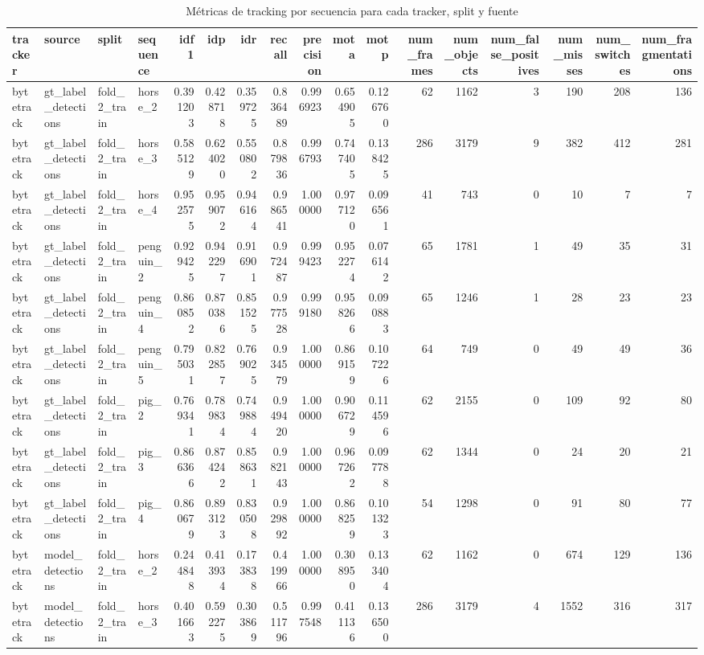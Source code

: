 \begin{table}
\caption{Métricas de tracking por secuencia para cada tracker, split y fuente}
\label{tab:per_sequence_tracking_metrics}
\begin{tabular}{llllrrrrrrrrrrrrr}
\toprule
tracker & source & split & sequence & idf1 & idp & idr & recall & precision & mota & motp & num_frames & num_objects & num_false_positives & num_misses & num_switches & num_fragmentations \\
\midrule
bytetrack & gt_label_detections & fold_2_train & horse_2 & 0.391203 & 0.428718 & 0.359725 & 0.836489 & 0.996923 & 0.654905 & 0.126760 & 62 & 1162 & 3 & 190 & 208 & 136 \\
bytetrack & gt_label_detections & fold_2_train & horse_3 & 0.585129 & 0.624020 & 0.550802 & 0.879836 & 0.996793 & 0.747405 & 0.138425 & 286 & 3179 & 9 & 382 & 412 & 281 \\
bytetrack & gt_label_detections & fold_2_train & horse_4 & 0.952575 & 0.959072 & 0.946164 & 0.986541 & 1.000000 & 0.977120 & 0.096561 & 41 & 743 & 0 & 10 & 7 & 7 \\
bytetrack & gt_label_detections & fold_2_train & penguin_2 & 0.929425 & 0.942297 & 0.916901 & 0.972487 & 0.999423 & 0.952274 & 0.076142 & 65 & 1781 & 1 & 49 & 35 & 31 \\
bytetrack & gt_label_detections & fold_2_train & penguin_4 & 0.860852 & 0.870386 & 0.851525 & 0.977528 & 0.999180 & 0.958266 & 0.090883 & 65 & 1246 & 1 & 28 & 23 & 23 \\
bytetrack & gt_label_detections & fold_2_train & penguin_5 & 0.795031 & 0.822857 & 0.769025 & 0.934579 & 1.000000 & 0.869159 & 0.107226 & 64 & 749 & 0 & 49 & 49 & 36 \\
bytetrack & gt_label_detections & fold_2_train & pig_2 & 0.769341 & 0.789834 & 0.749884 & 0.949420 & 1.000000 & 0.906729 & 0.114596 & 62 & 2155 & 0 & 109 & 92 & 80 \\
bytetrack & gt_label_detections & fold_2_train & pig_3 & 0.866366 & 0.874242 & 0.858631 & 0.982143 & 1.000000 & 0.967262 & 0.097788 & 62 & 1344 & 0 & 24 & 20 & 21 \\
bytetrack & gt_label_detections & fold_2_train & pig_4 & 0.860679 & 0.893123 & 0.830508 & 0.929892 & 1.000000 & 0.868259 & 0.101323 & 54 & 1298 & 0 & 91 & 80 & 77 \\
bytetrack & model_detections & fold_2_train & horse_2 & 0.244848 & 0.413934 & 0.173838 & 0.419966 & 1.000000 & 0.308950 & 0.133404 & 62 & 1162 & 0 & 674 & 129 & 136 \\
bytetrack & model_detections & fold_2_train & horse_3 & 0.401663 & 0.592275 & 0.303869 & 0.511796 & 0.997548 & 0.411136 & 0.136500 & 286 & 3179 & 4 & 1552 & 316 & 317 \\

\end{tabular}
\end{table}
